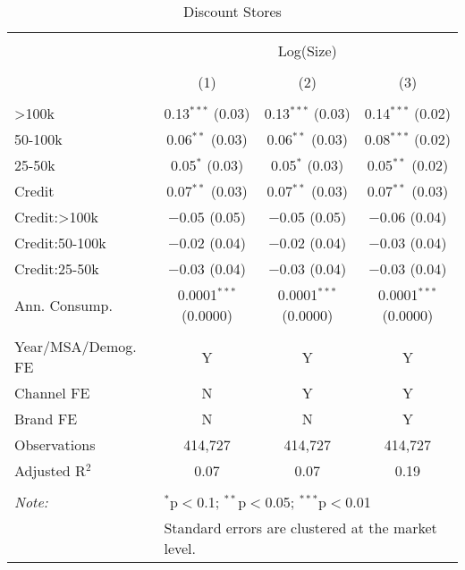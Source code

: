 
\begin{table}[!htbp] \centering 
  \caption{Discount Stores} 
  \label{tab:packageSizeDiscountSoda} 
\begin{tabular}{@{\extracolsep{5pt}}lccc} 
\\[-1.8ex]\hline 
\hline \\[-1.8ex] 
 & \multicolumn{3}{c}{Log(Size)} \\ 
\\[-1.8ex] & (1) & (2) & (3)\\ 
\hline \\[-1.8ex] 
 >100k & 0.13$^{***}$ (0.03) & 0.13$^{***}$ (0.03) & 0.14$^{***}$ (0.02) \\ 
  50-100k & 0.06$^{**}$ (0.03) & 0.06$^{**}$ (0.03) & 0.08$^{***}$ (0.02) \\ 
  25-50k & 0.05$^{*}$ (0.03) & 0.05$^{*}$ (0.03) & 0.05$^{**}$ (0.02) \\ 
  Credit & 0.07$^{**}$ (0.03) & 0.07$^{**}$ (0.03) & 0.07$^{**}$ (0.03) \\ 
  Credit:>100k & $-$0.05 (0.05) & $-$0.05 (0.05) & $-$0.06 (0.04) \\ 
  Credit:50-100k & $-$0.02 (0.04) & $-$0.02 (0.04) & $-$0.03 (0.04) \\ 
  Credit:25-50k & $-$0.03 (0.04) & $-$0.03 (0.04) & $-$0.03 (0.04) \\ 
  Ann. Consump. & 0.0001$^{***}$ (0.0000) & 0.0001$^{***}$ (0.0000) & 0.0001$^{***}$ (0.0000) \\ 
 \hline \\[-1.8ex] 
Year/MSA/Demog. FE & Y & Y & Y \\ 
Channel FE & N & Y & Y \\ 
Brand FE & N & N & Y \\ 
Observations & 414,727 & 414,727 & 414,727 \\ 
Adjusted R$^{2}$ & 0.07 & 0.07 & 0.19 \\ 
\hline 
\hline \\[-1.8ex] 
\textit{Note:}  & \multicolumn{3}{l}{$^{*}$p$<$0.1; $^{**}$p$<$0.05; $^{***}$p$<$0.01} \\ 
 & \multicolumn{3}{l}{Standard errors are clustered at the market level.} \\ 
\end{tabular} 
\end{table} 
